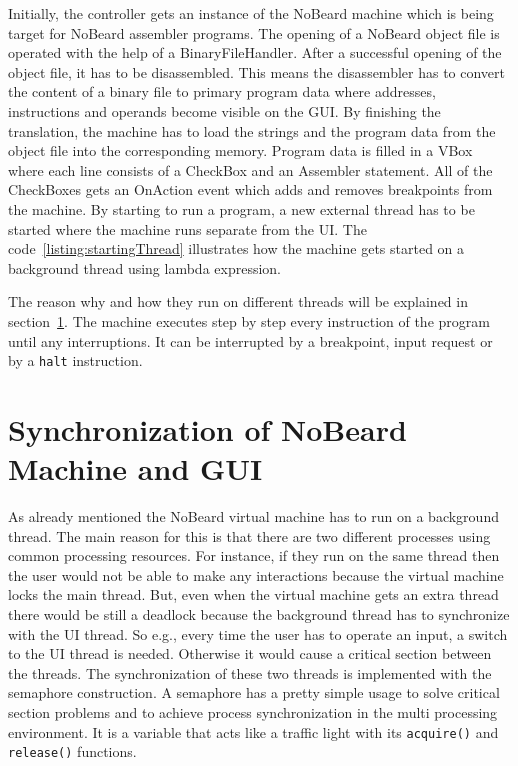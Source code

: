Initially, the controller gets an instance of the NoBeard machine which is being target for NoBeard assembler programs. The opening of a NoBeard object file is operated with the help of a BinaryFileHandler. After a successful opening of the object file, it has to be disassembled. This means the disassembler has to convert the content of a binary file to primary program data where addresses, instructions and operands become visible on the GUI.
By finishing the translation, the machine has to load the strings and the program data from the object file into the corresponding memory. Program data is filled in a VBox where each line consists of a CheckBox and an Assembler statement. All of the CheckBoxes gets an OnAction event which adds and removes breakpoints from the machine. 
By starting to run a program, a new external thread has to be started where the machine runs separate from the UI. The code~\ref{listing:startingThread} illustrates how the machine gets started on a background thread using lambda expression.
The reason why and how they run on different threads will be explained in section~\ref{sec:synchronization}. The machine executes step by step every instruction of the program until any interruptions. It can be interrupted by a breakpoint, input request or by a \lstinline$halt$ instruction. 
\section{Synchronization of NoBeard Machine and GUI}
\label{sec:synchronization} 
As already mentioned the NoBeard virtual machine has to run on a background thread. The main reason for this is that there are two different processes using common processing resources. For instance, if they run on the same thread then the user would not be able to make any interactions because the virtual machine locks the main thread. But, even when the virtual machine gets an extra thread there would be still a deadlock because the background thread has to synchronize with the UI thread. So e.g., every time the user has to operate an input, a switch to the UI thread is needed. Otherwise it would cause a critical section between the threads. The synchronization of these two threads is implemented with the semaphore construction. A semaphore has a pretty simple usage to solve critical section problems and to achieve process synchronization in the multi processing environment. It is a variable that acts like a traffic light with its \texttt{acquire()} and \texttt{release()} functions.

